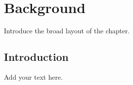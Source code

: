 
\chapter[Abbreviated title]{Background}
\label{Chap:label}	%
\pagestyle{headings}



Introduce the broad layout of the chapter.



\section{Introduction}
\label{Sec:label}	%

Add your text here. 

